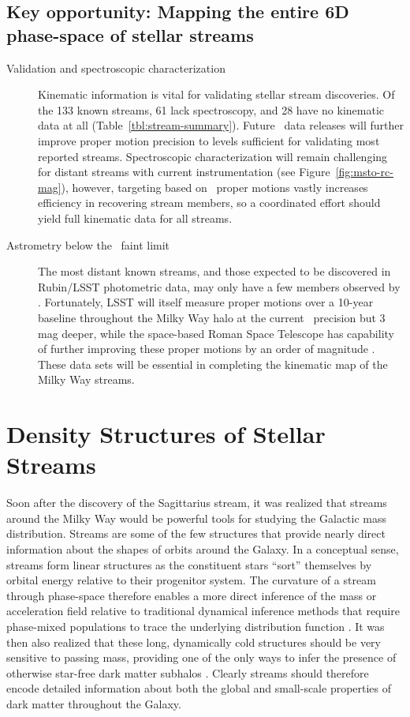 \documentclass[final,5p,times,twocolumn,authoryear]{elsarticle}
\begin{document}
\subsection{Key opportunity: Mapping the entire 6D phase-space of stellar streams}
\begin{description}
\item[Validation and spectroscopic characterization]{
Kinematic information is vital for validating stellar stream discoveries.
Of the 133 known streams, 61 lack spectroscopy, and 28 have no kinematic data at all (Table~\ref{tbl:stream-summary}).
Future \gaia\ data releases will further improve proper motion precision to levels sufficient for validating most reported streams.
Spectroscopic characterization will remain challenging for distant streams with current instrumentation (see Figure~\ref{fig:msto-rc-mag}), however, targeting based on \gaia\ proper motions vastly increases efficiency in recovering stream members, so a coordinated effort should yield full kinematic data for all streams.
}
\item[Astrometry below the \gaia\ faint limit]{
The most distant known streams, and those expected to be discovered in Rubin/LSST photometric data, may only have a few members observed by \gaia.
Fortunately, LSST will itself measure proper motions over a 10-year baseline throughout the Milky Way halo at the current \gaia\ precision but 3\,mag deeper, while the space-based Roman Space Telescope has capability of further improving these proper motions by an order of magnitude \citep[][]{sanderson:2019}.
These data sets will be essential in completing the kinematic map of the Milky Way streams.
}
\end{description}



\section{Density Structures of Stellar Streams}
\label{sec:structure}

Soon after the discovery of the Sagittarius stream, it was realized that streams around
the Milky Way would be powerful tools for studying the Galactic mass distribution.
Streams are some of the few structures that provide nearly direct information about
the shapes of orbits around the Galaxy.
In a conceptual sense, streams form linear structures as the constituent stars ``sort''
themselves by orbital energy relative to their progenitor system.
The curvature of a stream through phase-space therefore enables a more direct inference
of the mass or acceleration field relative to traditional dynamical inference methods
that require phase-mixed populations to trace the underlying distribution function
\citep{bonaca:2018}.
It was then also realized that these long, dynamically cold structures should be very
sensitive to passing mass, providing one of the only ways to infer the presence of
otherwise star-free dark matter subhalos \citep{johnston:2002, ibata:2002, yoon:2011}.
Clearly streams should therefore encode detailed information about both the global and
small-scale properties of dark matter throughout the Galaxy.
\end{document}
